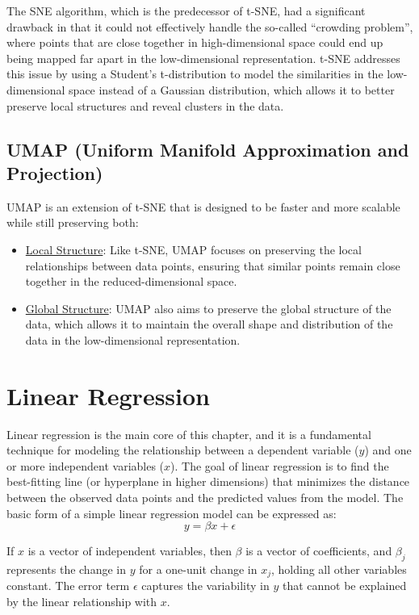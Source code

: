 \begin{observacion}
    The SNE algorithm, which is the predecessor of t-SNE, had a significant drawback in that it could not effectively handle the so-called ``crowding problem'', where points that are close together in high-dimensional space could end up being mapped far apart in the low-dimensional representation. t-SNE addresses this issue by using a Student's t-distribution to model the similarities in the low-dimensional space instead of a Gaussian distribution, which allows it to better preserve local structures and reveal clusters in the data.
\end{observacion}

\subsection{UMAP (Uniform Manifold Approximation and Projection)}
UMAP is an extension of t-SNE that is designed to be faster and more scalable while still preserving both:
\begin{itemize}
    \item \ul{Local Structure}: Like t-SNE, UMAP focuses on preserving the local relationships between data points, ensuring that similar points remain close together in the reduced-dimensional space.
    \item \ul{Global Structure}: UMAP also aims to preserve the global structure of the data, which allows it to maintain the overall shape and distribution of the data in the low-dimensional representation.
\end{itemize}


\section{Linear Regression}

Linear regression is the main core of this chapter, and it is a fundamental technique for modeling the relationship between a dependent variable ($y$) and one or more independent variables ($x$). The goal of linear regression is to find the best-fitting line (or hyperplane in higher dimensions) that minimizes the distance between the observed data points and the predicted values from the model. The basic form of a simple linear regression model can be expressed as:
\begin{equation*}
    y = \beta x + \epsilon
\end{equation*}

If $x$ is a vector of independent variables, then $\beta$ is a vector of coefficients, and $\beta_j$ represents the change in $y$ for a one-unit change in $x_j$, holding all other variables constant. The error term $\epsilon$ captures the variability in $y$ that cannot be explained by the linear relationship with $x$.

